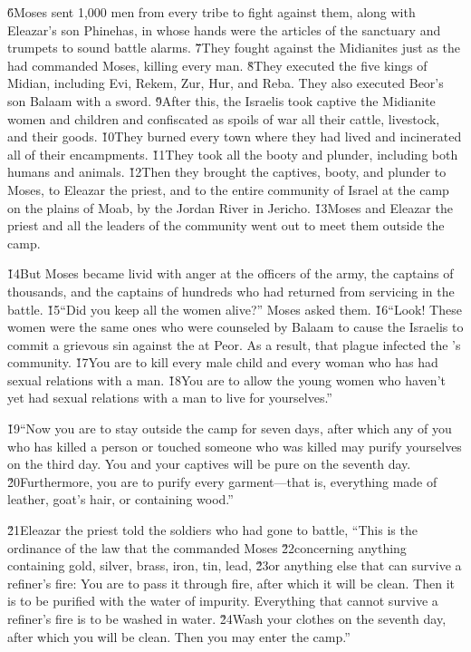 \v{6}Moses sent 1,000 men from every tribe to fight against them, along with Eleazar's son Phinehas, in whose hands were the articles of the sanctuary and trumpets to sound battle alarms. \v{7}They fought against the Midianites just as the  had commanded Moses, killing every man. \v{8}They executed the five kings of Midian, including Evi, Rekem, Zur, Hur, and Reba. They also executed Beor's son Balaam with a sword. \v{9}After this, the Israelis took captive the Midianite women and children and confiscated as spoils of war all their cattle, livestock, and their goods. \v{10}They burned every town where they had lived and incinerated all of their encampments. \v{11}They took all the booty and plunder, including both humans and animals. \v{12}Then they brought the captives, booty, and plunder to Moses, to Eleazar the priest, and to the entire community of Israel at the camp on the plains of Moab, by the Jordan River in Jericho. \v{13}Moses and Eleazar the priest and all the leaders of the community went out to meet them outside the camp.

\v{14}But Moses became livid with anger at the officers of the army, the captains of thousands, and the captains of hundreds who had returned from servicing in the battle. \v{15}``Did you keep all the women alive?'' Moses asked them. \v{16}``Look! These women were the same ones who were counseled by Balaam to cause the Israelis to commit a grievous sin against the  at Peor. As a result, that plague infected the 's community. \v{17}You are to kill every male child and every woman who has had sexual relations with a man. \v{18}You are to allow the young women who haven't yet had sexual relations with a man to live for yourselves.''

\v{19}``Now you are to stay outside the camp for seven days, after which any of you who has killed a person or touched someone who was killed may purify yourselves on the third day. You and your captives will be pure on the seventh day. \v{20}Furthermore, you are to purify every garment---that is, everything made of leather, goat's hair, or containing wood.''

\v{21}Eleazar the priest told the soldiers who had gone to battle, ``This is the ordinance of the law that the  commanded Moses \v{22}concerning anything containing gold, silver, brass, iron, tin, lead, \v{23}or anything else that can survive a refiner's fire: You are to pass it through fire, after which it will be clean. Then it is to be purified with the water of impurity. Everything that cannot survive a refiner's fire is to be washed in water. \v{24}Wash your clothes on the seventh day, after which you will be clean. Then you may enter the camp.''

